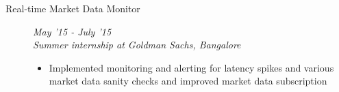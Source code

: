 \documentclass[9pt]{article}
\newenvironment{changemargin}[2]{%
  \begin{list}{}{%
      \setlength{\topsep}{0pt}%
    \setlength{\leftmargin}{#1}%
    \setlength{\rightmargin}{#2}%
    \setlength{\listparindent}{\parindent}%
  \setlength{\itemindent}{\parindent}%
    \setlength{\parsep}{\parskip}%
    }%
  \item[]}{\end{list}
    }
\newenvironment{body} {
  \vspace*{-16pt}
        \begin{changemargin}{-0.6in}{-0.65in}
        }	
        {\end{changemargin}
}
\begin{document}
\begin{body}
\begin{description}
    \item[\normalsize{Real-time Market Data Monitor}] \hfill \textit{May '15 - July '15} \\
      \textit{Summer internship at Goldman Sachs, Bangalore} 
      \begin{itemize}
        \item Implemented monitoring and alerting for latency spikes and various
          market data sanity checks and improved market data subscription
      \end{itemize}

  \end{description}

\end{body}
\end{document}
